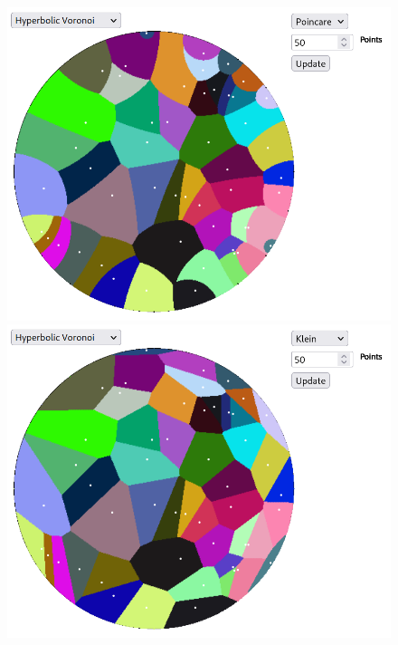 \documentclass[12pt]{article}%
\begin{document}
\begin{enumerate}
\begin{figure}[H]
		\includegraphics[scale=0.25]{p_voronoi_big.png}
		\includegraphics[scale=0.25]{k_voronoi_big.png}
	\end{figure}
\end{enumerate}



\end{document}
